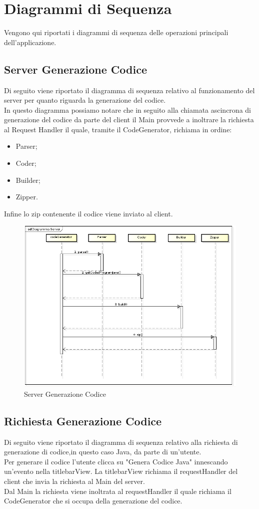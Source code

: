 \documentclass[../DefinizioneDiProdotto.tex]{subfiles}
\begin{document}
\section{Diagrammi di Sequenza}
Vengono qui riportati i diagrammi di sequenza delle operazioni principali dell'applicazione.
\subsection{Server Generazione Codice}
Di seguito viene riportato il diagramma di sequenza relativo al funzionamento del server per quanto riguarda la generazione del codice.\\
In questo diagramma possiamo notare che in seguito alla chiamata ascincrona di generazione del codice da parte del client il Main  provvede a inoltrare la richiesta al Request Handler il quale, tramite il CodeGenerator, richiama in ordine:
\begin{itemize}
	\item Parser;
	\item Coder;
	\item Builder;
	\item Zipper.
\end{itemize} 
Infine lo zip contenente il codice viene inviato al client.

\begin{figure}[H]\label{fig:Server}
	\centering
	\includegraphics[scale=0.46]{Immagini/DiagrammaCodice.png}
	\caption{Server Generazione Codice}
\end{figure}


\subsection{Richiesta Generazione Codice}
Di seguito viene riportato il diagramma di sequenza relativo alla richiesta di generazione di codice,in questo caso Java, da parte di un'utente.\\
Per generare il codice l'utente clicca su "Genera Codice Java" innescando un'evento nella titlebarView.
La titlebarView richiama il requestHandler del client che invia la richiesta al Main del server.\\
Dal Main la richiesta viene inoltrata al requestHandler il quale richiama il CodeGenerator che si occupa della generazione del codice.
\end{document}
